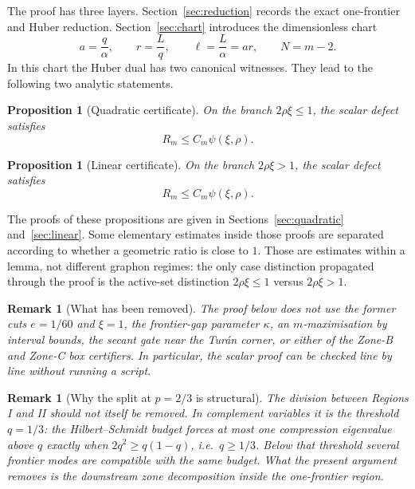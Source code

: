 \documentclass[11pt]{article}
\newtheorem{proposition}[theorem]{Proposition}
\newtheorem{remark}[theorem]{Remark}
\begin{document}
The proof has three layers.  Section~\ref{sec:reduction} records the exact
one-frontier and Huber reduction.  Section~\ref{sec:chart} introduces the
dimensionless chart
\[
        a=\frac q\alpha,\qquad r=\frac Lq,\qquad
        \ell=\frac L\alpha=ar,\qquad N=m-2.
\]
In this chart the Huber dual has two canonical witnesses.  They lead to the
following two analytic statements.

\begin{proposition}[Quadratic certificate]\label{prop:quadratic}
On the branch $2\rho\xi\le1$, the scalar defect satisfies
\[
        R_m\le C_m\psi(\xi,\rho).
\]
\end{proposition}

\begin{proposition}[Linear certificate]\label{prop:linear}
On the branch $2\rho\xi>1$, the scalar defect satisfies
\[
        R_m\le C_m\psi(\xi,\rho).
\]
\end{proposition}

The proofs of these propositions are given in
Sections~\ref{sec:quadratic} and~\ref{sec:linear}.  Some elementary estimates
inside those proofs are separated according to whether a geometric ratio is
close to $1$.  Those are estimates within a lemma, not different graphon
regimes: the only case distinction propagated through the proof is the
active-set distinction $2\rho\xi\le1$ versus $2\rho\xi>1$.

\begin{remark}[What has been removed]\label{rem:removed}
The proof below does not use the former cuts $e=1/60$ and $\xi=1$, the
frontier-gap parameter $\kappa$, an $m$-maximisation by interval bounds, the
secant gate near the Tur\'an corner, or either of the Zone-B and Zone-C box
certifiers.  In particular, the scalar proof can be checked line by line
without running a script.
\end{remark}

\begin{remark}[Why the split at \(p=2/3\) is structural]
The division between Regions I and II should not itself be removed.  In
complement variables it is the threshold \(q=1/3\): the Hilbert--Schmidt
budget forces at most one compression eigenvalue above \(q\) exactly when
\(2q^2\ge q(1-q)\), i.e.\ \(q\ge1/3\).  Below that threshold several frontier
modes are compatible with the same budget.  What the present argument removes
is the downstream zone decomposition inside the one-frontier region.
\end{remark}
\end{document}
